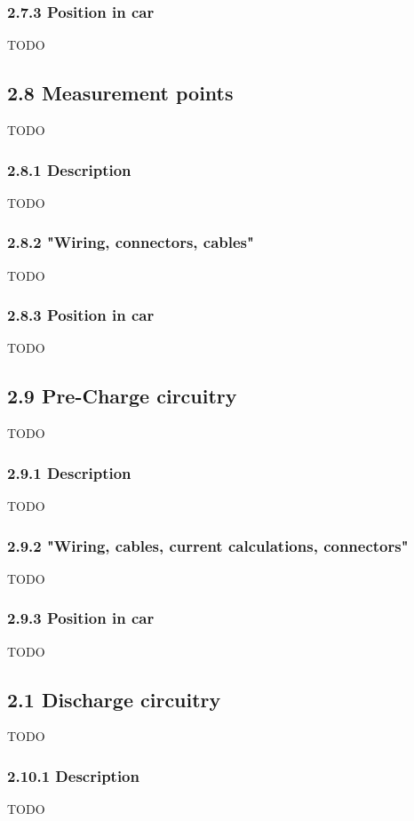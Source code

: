 \documentclass{article}
\begin{document}
\subsubsection*{2.7.3 Position in car}
TODO

\subsection*{2.8 Measurement points}
TODO

\subsubsection*{2.8.1 Description}
TODO

\subsubsection*{2.8.2 "Wiring, connectors, cables"}
TODO

\subsubsection*{2.8.3 Position in car}
TODO

\subsection*{2.9 Pre-Charge circuitry}
TODO

\subsubsection*{2.9.1 Description}
TODO

\subsubsection*{2.9.2 "Wiring, cables, current calculations, connectors"}
TODO

\subsubsection*{2.9.3 Position in car}
TODO

\subsection*{2.1 Discharge circuitry}
TODO

\subsubsection*{2.10.1 Description}
TODO
\end{document}
